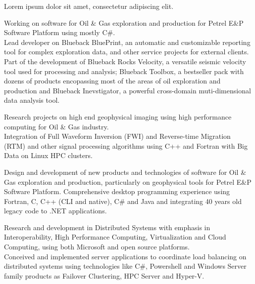 \documentclass[11pt, a4paper, sans]{moderncv} %
\begin{document}
{
Lorem ipsum dolor sit amet, consectetur adipiscing elit.
}

{
Working on software for Oil \& Gas exploration and production for Petrel E\&P Software Platform using mostly C\#.\\ 
Lead developer on  Blueback BluePrint, an automatic and customizable reporting tool for complex exploration data, and other service projects for external clients.\\
Part of the development of Blueback Rocks Velocity, a versatile seismic velocity tool used for processing and analysis;  Blueback Toolbox, a bestseller pack with dozens of products encopassing most of the areas of oil exploration and production and Blueback Inevstigator, a powerful cross-domain muti-dimensional data analysis tool.
}


{
Research projects on high end geophysical imaging using high performance computing for Oil \& Gas industry.\\
Integration of Full Waveform Inversion (FWI) and Reverse-time Migration (RTM) and other signal processing algorithms using C++ and Fortran with Big Data on Linux HPC clusters.
}




{
Design and development of new products and technologies of software for Oil \& Gas exploration and production, particularly on geophysical tools for Petrel E\&P Software Platform. 
Comprehensive desktop programming experience using Fortran, C, C++ (CLI and native), C\# and Java and integrating 40 years old legacy code to .NET applications.
}


{
Research and development in Distributed Systems with emphasis in Interoperability, High Performance Computing, Virtualization and Cloud Computing, using both Microsoft and open source platforms.\\
Conceived and implemented server applications to coordinate load balancing on distributed systems using technologies like C\#, Powershell and Windows Server family products as Failover Clustering, HPC Server and Hyper-V.
}
\end{document}
